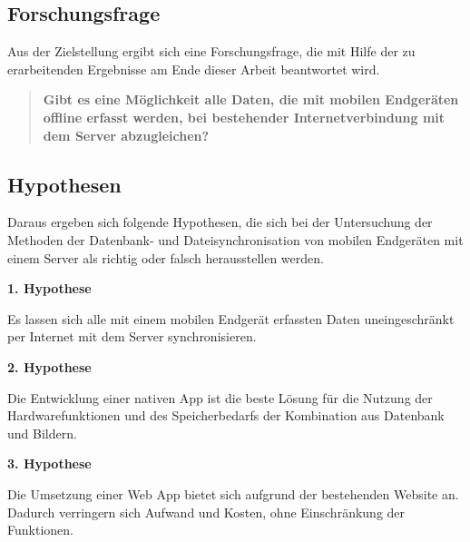 \subsection{Forschungsfrage}
\label{subsec:problem:prob}

Aus der Zielstellung ergibt sich eine Forschungsfrage, die mit Hilfe der zu erarbeitenden Ergebnisse am Ende dieser Arbeit beantwortet wird.

\begin{quote}
	\textbf {Gibt es eine Möglichkeit alle Daten, die mit mobilen Endgeräten offline erfasst werden, bei bestehender Internetverbindung mit dem Server abzugleichen?}
\end{quote}

\cleardoublepage

\subsection{Hypothesen}
\label{subsec:hypothesis:hypo}

Daraus ergeben sich folgende Hypothesen, die sich bei der Untersuchung der Methoden der Datenbank- und Dateisynchronisation von mobilen Endgeräten mit einem Server als richtig oder falsch herausstellen werden.

\textbf {1. Hypothese}

Es lassen sich alle mit einem mobilen Endgerät erfassten Daten uneingeschränkt per Internet mit dem Server synchronisieren.

\textbf {2. Hypothese}

Die Entwicklung einer nativen App ist die beste Lösung für die Nutzung der Hardwarefunktionen und des Speicherbedarfs der Kombination aus Datenbank und Bildern.

\textbf {3. Hypothese}

Die Umsetzung einer Web App bietet sich aufgrund der bestehenden Website an. Dadurch verringern sich Aufwand und Kosten, ohne Einschränkung der Funktionen.
